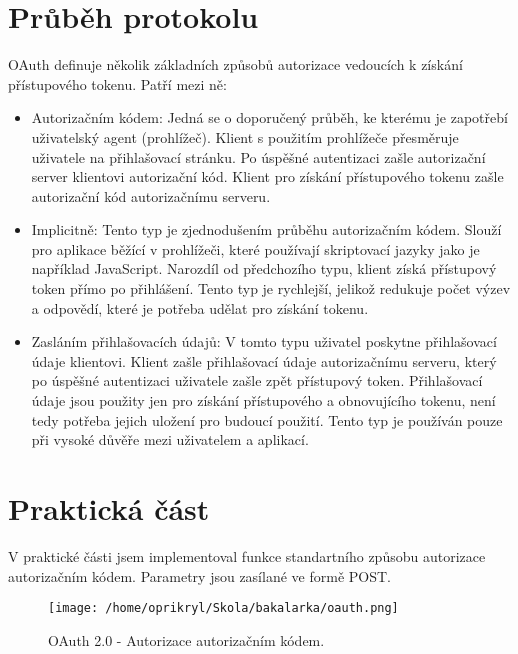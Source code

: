 \documentclass[]{fithesis3}
\begin{document}
	\section{Průběh protokolu}

	OAuth definuje několik základních způsobů autorizace vedoucích k získání přístupového 			tokenu. Patří mezi ně:

		\begin{itemize}
 		\item Autorizačním kódem:
  		\newline
		Jedná se o doporučený průběh, ke kterému je zapotřebí uživatelský agent 						(prohlížeč). Klient s použitím prohlížeče přesměruje uživatele na přihlašovací stránku. Po 			úspěšné autentizaci zašle autorizační server klientovi autorizační kód. Klient pro získání 			přístupového tokenu zašle autorizační kód autorizačnímu serveru.
  		\item Implicitně:
  		\newline
		Tento typ je zjednodušením průběhu autorizačním kódem. Slouží pro aplikace běžící 				v prohlížeči, které používají skriptovací jazyky jako je například JavaScript. Narozdíl od 			předchozího typu, klient získá přístupový token přímo po přihlášení. Tento typ je rychlejší, 			jelikož redukuje počet výzev a odpovědí, které je potřeba udělat pro získání tokenu.
 	 	\item Zasláním přihlašovacích údajů:
  		\newline
		V tomto typu uživatel poskytne přihlašovací údaje klientovi. Klient zašle přihlašovací údaje 		autorizačnímu serveru, který po úspěšné autentizaci uživatele zašle zpět přístupový 				token. Přihlašovací údaje jsou použity jen pro získání přístupového a obnovujícího tokenu, 			není tedy potřeba jejich uložení pro budoucí použití. Tento typ je používán pouze při 				vysoké důvěře mezi uživatelem a aplikací. 
		\end{itemize}
		
	\newpage
	\section{Praktická část}

	V praktické části jsem implementoval funkce standartního způsobu autorizace autorizačním 			kódem. Parametry jsou zasílané ve formě POST.

	\begin{figure}
  		\begin{minipage}{1.00\textwidth}
    			\texttt{[image: /home/oprikryl/Skola/bakalarka/oauth.png]}
  		\end{minipage}
 		\caption{OAuth 2.0 - Autorizace autorizačním kódem.}
  		\label{fig:oauth}
	\end{figure}
\end{document}

